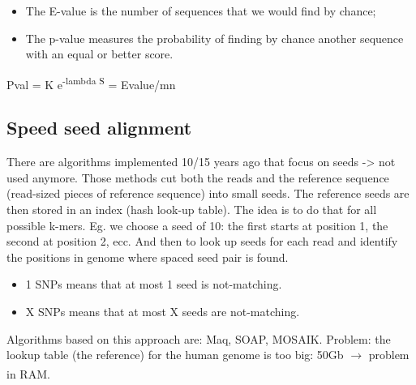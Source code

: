 \begin{itemize}
    \item The E-value is the number of sequences that we would find by chance;
    \item The p-value measures the probability of finding by chance another sequence with an equal or better score.
\end{itemize}

\begin{center}
    Pval = K e\textsuperscript{-lambda S} = Evalue/mn
\end{center}

\subsection{Speed seed alignment}

There are algorithms implemented 10/15 years ago that focus on seeds -> not used anymore. 
Those methods cut both the reads and the reference sequence (read-sized pieces of reference sequence) into small seeds. The reference seeds are then stored in an index (hash look-up table).
The idea is to do that for all possible k-mers. Eg. we choose a seed of 10: the first starts at position 1, the second at position 2, ecc. And then to look up seeds for each read and identify the positions in genome where spaced seed pair is found. 

\begin{itemize}
    \item 1 SNPs means that at most 1 seed is not-matching.
    \item X SNPs means that at most X seeds are not-matching.
\end{itemize}

Algorithms based on this approach are: Maq, SOAP, MOSAIK. 
Problem: the lookup table (the reference) for the human genome is too big: 50Gb $\xrightarrow[]{}$ problem in RAM.

